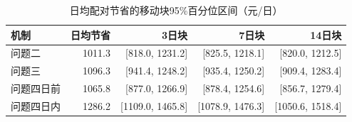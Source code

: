 \begin{table}[htbp]\centering\small
\caption{日均配对节省的移动块95\%百分位区间（元/日）}
\begin{tabular}{lrrrr}
\toprule
机制 & 日均节省 & 3日块 & 7日块 & 14日块 \\
\midrule
问题二 & 1011.3 & [818.0, 1231.2] & [825.5, 1218.1] & [820.0, 1212.5] \\
问题三 & 1096.3 & [941.4, 1248.2] & [935.4, 1250.2] & [909.4, 1283.4] \\
问题四日前 & 1065.8 & [877.0, 1266.9] & [878.4, 1254.6] & [856.7, 1279.4] \\
问题四日内 & 1286.2 & [1109.0, 1465.8] & [1078.9, 1476.3] & [1050.6, 1518.4] \\
\bottomrule\end{tabular}\end{table}
